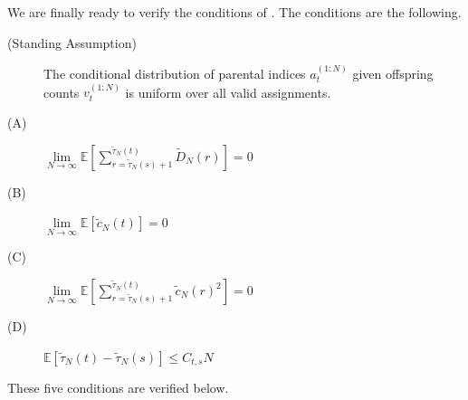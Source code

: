 \documentclass[fleqn]{article}
\newcommand{\E}{\mathbb{E}}
\newcommand{\limNtoinfty}{\underset{N\to\infty}{\lim}}
\begin{document}
We are finally ready to verify the conditions of \citet[Theorem 1]{koskela2018}. The conditions are the following.
\begin{description}
\item[(Standing Assumption)] The conditional distribution of parental indices $a_t^{(1:N)}$ given offspring counts $v_t^{(1:N)}$ is uniform over all valid assignments.
\item[(A)] $\limNtoinfty \E\left[ \sum_{r=\tilde{\tau}_N(s)+1}^{\tilde{\tau}_N(t)} \tilde{D}_N(r) \right] =0$
\item[(B)] $\limNtoinfty \E[\tilde{c}_N(t)] =0$
\item[(C)] $\limNtoinfty \E\left[ \sum_{r=\tilde{\tau}_N(s)+1}^{\tilde{\tau}_N(t)} \tilde{c}_N(r)^2 \right] =0$
\item[(D)] $\E[\tilde{\tau}_N(t) - \tilde{\tau}_N(s)] \leq C_{t,s}N$
\end{description}
These five conditions are verified below.
\end{document}
